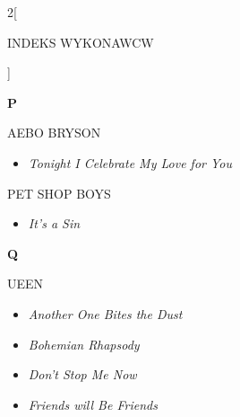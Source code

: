 \documentclass[a4paper]{report}
\begin{document}
\begin{multicols*}{2}[\begin{Huge}INDEKS WYKONAWCW\end{Huge}\vspace{1cm}]
\begin{minipage}{\columnwidth}
\begin{itemize}[topsep=3pt, after=\vspace{3mm}]
	\end{itemize}
\end{minipage}
\begin{minipage}{\columnwidth}
	\begin{Large}\textbf{P}\end{Large}AEBO BRYSON 
	\begin{itemize}[topsep=3pt, after=\vspace{3mm}]
		\itemsep0em
		\item[]\textit{Tonight I Celebrate My Love for You}  \\
	\end{itemize}
\end{minipage}
\begin{minipage}{\columnwidth}
	PET SHOP BOYS 
	\begin{itemize}[topsep=3pt, after=\vspace{3mm}]
		\itemsep0em
		\item[]\textit{It's a Sin}  \\
	\end{itemize}
\end{minipage}
\begin{minipage}{\columnwidth}
	\begin{Large}\textbf{Q}\end{Large}UEEN 
	\begin{itemize}[topsep=3pt, after=\vspace{1.5mm}]
		\itemsep0em
		\item[]\textit{Another One Bites the Dust}  \\
		\item[]  \textit{Bohemian Rhapsody}  \\
	\end{itemize}
\end{minipage}
\begin{minipage}{\columnwidth}
	\begin{itemize}[topsep=3pt, after=\vspace{1.5mm}]
		\itemsep0em
		\item[]  \textit{Don't Stop Me Now}  \\
	\end{itemize}
\end{minipage}
\begin{minipage}{\columnwidth}
	\begin{itemize}[topsep=3pt, after=\vspace{1.5mm}]
		\itemsep0em
		\item[]  \textit{Friends will Be Friends}  \\

\end{itemize}
\end{minipage}
\end{multicols*}
\end{document}
